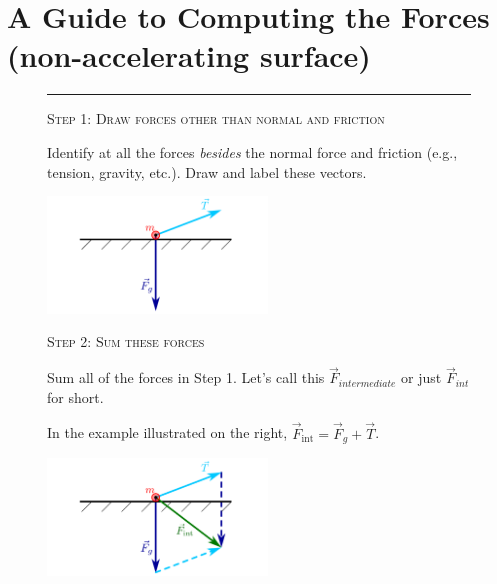 \documentclass[10pt,letterpaper,twoside]{article}
\begin{document}
\section{A Guide to Computing the Forces (non-accelerating surface)}
\begin{figure}[h!]
	\hrule%

  \begin{minipage}[l]{0.70\textwidth}
	{\Large\textsc{Step 1}:} {\large \textsc{Draw forces other than normal and friction}}{\quad}

	Identify at all the forces \textit{besides} the normal force and friction (e.g., tension, gravity, etc.).
	Draw and label these vectors.
  \end{minipage}
  \begin{minipage}[l]{0.25\textwidth}
	\includegraphics[keepaspectratio=true,width=2.30in]{./how_to_normal_force_and_friction_f01.pdf}
    \label{fig:01}
  \end{minipage}
\end{figure}
\FloatBarrier
\begin{figure}[h!]
  \begin{minipage}[l]{0.70\textwidth}
	{\Large\textsc{Step 2}:} {\large\textsc{Sum these forces}}{\quad}

	Sum all of the forces in Step 1.
	Let's call this $\vec F_{intermediate}$ or just $\vec F_{int}$ for short.

	\vspace{10pt}
	In the example illustrated on the right, $\vec F_{\text{int}}=\vec F_{g} + \vec T$.
  \end{minipage}
  \begin{minipage}[c]{0.25\textwidth}
	\includegraphics[keepaspectratio=true,width=2.30in]{./how_to_normal_force_and_friction_f02.pdf}
    \label{fig:02}
  \end{minipage}
\end{figure}
\end{document}
